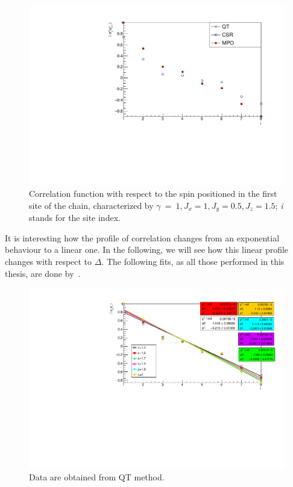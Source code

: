 \begin{figure}[H]
    \centering
    \includegraphics[scale=0.7]{Figures/8sites_comparison/CorrFunc1_8s_J10515.pdf}
    \caption{Correlation function with respect to the spin positioned in the first site of the chain, characterized by $\gamma~=~1, J_x=1, J_y=0.5, J_z=1.5$; \emph{i} stands for the site index.}
    \label{fig:my_label}
\end{figure}

It is interesting how the profile of correlation changes from an exponential behaviour to a linear one. In the following, we will see how this linear profile changes with respect to $\Delta$. The following fits, as all those performed in this thesis, are done by~\cite{root_cern}.

\begin{figure}[H]
    \centering
    \includegraphics[scale=0.8]{Figures/8sites_comparison/FIT8sCorrFunc1_MPO_over15.pdf}
    \caption{Data are obtained from QT method.}
    \label{fig:my_label}
\end{figure}




